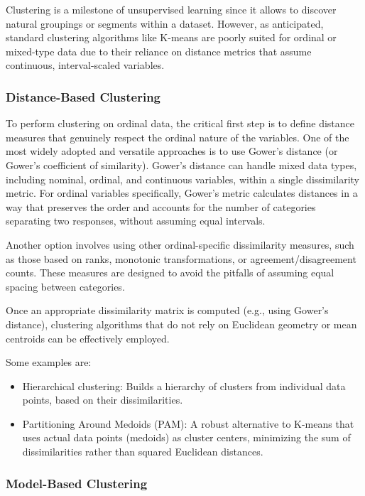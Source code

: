 \documentclass[
  letterpaper,
  DIV=11,
  numbers=noendperiod]{scrartcl}
\begin{document}
Clustering is a milestone of unsupervised learning since it allows to
discover natural groupings or segments within a dataset. However, as
anticipated, standard clustering algorithms like K-means are poorly
suited for ordinal or mixed-type data due to their reliance on distance
metrics that assume continuous, interval-scaled variables.

\hypertarget{distance-based-clustering}{%
\subsubsection{Distance-Based
Clustering}\label{distance-based-clustering}}

To perform clustering on ordinal data, the critical first step is to
define distance measures that genuinely respect the ordinal nature of
the variables. One of the most widely adopted and versatile approaches
is to use Gower's distance (or Gower's coefficient of similarity).
Gower's distance can handle mixed data types, including nominal,
ordinal, and continuous variables, within a single dissimilarity metric.
For ordinal variables specifically, Gower's metric calculates distances
in a way that preserves the order and accounts for the number of
categories separating two responses, without assuming equal intervals.

Another option involves using other ordinal-specific dissimilarity
measures, such as those based on ranks, monotonic transformations, or
agreement/disagreement counts. These measures are designed to avoid the
pitfalls of assuming equal spacing between categories.

Once an appropriate dissimilarity matrix is computed (e.g., using
Gower's distance), clustering algorithms that do not rely on Euclidean
geometry or mean centroids can be effectively employed.

Some examples are:

\begin{itemize}
\item
  Hierarchical clustering: Builds a hierarchy of clusters from
  individual data points, based on their dissimilarities.
\item
  Partitioning Around Medoids (PAM): A robust alternative to K-means
  that uses actual data points (medoids) as cluster centers, minimizing
  the sum of dissimilarities rather than squared Euclidean distances.
\end{itemize}

\hypertarget{model-based-clustering}{%
\subsubsection{Model-Based Clustering}\label{model-based-clustering}}
\end{document}
